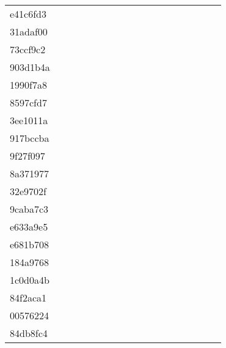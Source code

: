 \begin{table*}[htb]
\begin{tabular}{l|ccccccccccccccccc}
e41c6fd3  & \C & \X & \X & \X & \X & \X & \X & \X & \X & \X & \X & \X & \X & \C & \C & \C & \X\\
31adaf00  & \C & \X & \X & \X & \X & \X & \X & \X & \X & \X & \X & \X & \X & \C & \C & \C & \X\\
73ccf9c2  & \C & \X & \X & \X & \X & \X & \X & \X & \X & \X & \X & \X & \X & \X & \C & \X & \X\\
903d1b4a  & \C & \X & \X & \X & \X & \C & \X & \X & \X & \X & \C & \C & \C & \C & \C & \C & \C\\
1990f7a8  & \C & \X & \X & \X & \X & \X & \X & \X & \C & \X & \X & \X & \C & \C & \C & \C & \C\\
8597cfd7  & \C & \X & \X & \X & \X & \X & \X & \X & \C & \X & \X & \X & \X & \C & \C & \X & \C\\
3ee1011a  & \C & \X & \X & \X & \X & \X & \X & \C & \C & \X & \C & \C & \C & \C & \C & \C & \C\\
917bccba  & \C & \X & \X & \X & \X & \X & \X & \X & \X & \X & \X & \X & \C & \C & \C & \C & \C\\
9f27f097  & \C & \X & \X & \X & \X & \X & \X & \C & \X & \X & \C & \C & \C & \C & \C & \C & \X\\
8a371977  & \C & \X & \X & \X & \X & \C & \X & \X & \X & \X & \X & \X & \C & \C & \C & \X & \X\\
32e9702f  & \C & \X & \X & \X & \X & \X & \X & \X & \C & \X & \C & \C & \C & \C & \C & \C & \C\\
9caba7c3  & \C & \X & \X & \X & \X & \X & \X & \X & \X & \X & \X & \X & \X & \X & \C & \X & \X\\
e633a9e5  & \C & \X & \C & \C & \C & \C & \C & \C & \C & \C & \C & \C & \C & \C & \C & \C & \C\\
e681b708  & \C & \X & \X & \X & \X & \X & \X & \X & \X & \X & \X & \X & \X & \C & \X & \X & \X\\
184a9768  & \C & \X & \X & \X & \X & \X & \X & \X & \X & \X & \X & \X & \X & \C & \C & \X & \X\\
1c0d0a4b  & \C & \X & \X & \X & \X & \C & \C & \X & \X & \X & \X & \X & \X & \C & \C & \C & \C\\
84f2aca1  & \C & \X & \X & \X & \X & \C & \X & \C & \C & \X & \C & \C & \C & \C & \C & \C & \C\\
00576224  & \C & \C & \C & \C & \C & \C & \C & \C & \C & \C & \C & \C & \C & \C & \C & \C & \C\\
84db8fc4  & \C & \X & \X & \X & \X & \X & \X & \X & \X & \C & \C & \C & \C & \C & \C & \C & \C\\

\end{tabular}
\end{table*}
